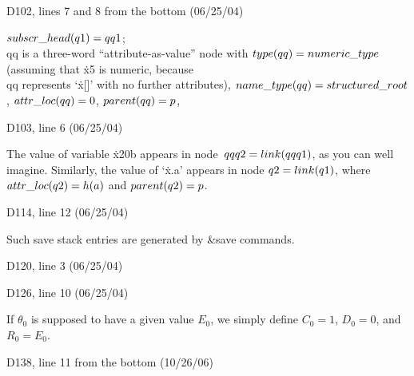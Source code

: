 {{\bugonpage D102, lines 7 and 8 from the bottom (06/25/04)

\noindent
$\\{subscr\_head}(\\{q1})=\\{qq1}$;
\\{qq} is a three-word ``attribute-as-value'' node with
$\\{type}(\\{qq})=\break\\{numeric\_type}$
(assuming that \.{x5} is numeric, because \\{qq} represents `\.{x[]}'
with no further\break
 attributes), $\\{name\_type}(\\{qq})=\\{structured\_root}$,
$\\{attr\_loc}(\\{qq})=0$, $\\{parent}(\\{qq})=p$,\cutpar

\bugonpage D103, line 6 (06/25/04)

\noindent
The value of variable \.{x20b}
appears in node~$\\{qqq2}=\\{link}(\\{qqq1})$, as you can well imagine.
Similarly, the value of `\.{x.a}' appears in node $\\{q2}=\\{link}(\\{q1})$,
where $\\{attr\_loc}(\\{q2})=h(a)$ and $\\{parent}(\\{q2})=p$.

\bugonpage D114, line 12 (06/25/04)

\noindent
\qquad Such save stack entries are generated by \&{save} commands.

\bugonpage D120, line 3 (06/25/04)

\ninepoint{}

\bugonpage D126, line 10 (06/25/04)

\tenpoint\noindent
If $\theta_0$ is supposed to have a given value $E_0$, we simply
define $C_0=1$, $D_0=0$, and $R_0=E_0$.\cutpar

\bugonpage D138, line 11 from the bottom (10/26/06)

}}
